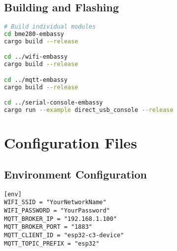 \documentclass[12pt,a4paper]{article}
\begin{document}
\subsection{Building and Flashing}
\begin{lstlisting}[language=bash, caption={Build and Flash Commands}]
# Build individual modules
cd bme280-embassy
cargo build --release

cd ../wifi-embassy  
cargo build --release

cd ../mqtt-embassy
cargo build --release

cd ../serial-console-embassy
cargo run --example direct_usb_console --release
\end{lstlisting}

\section{Configuration Files}

\subsection{Environment Configuration}
\begin{lstlisting}[caption={.cargo/config.toml}]
[env]
WIFI_SSID = "YourNetworkName"
WIFI_PASSWORD = "YourPassword"
MQTT_BROKER_IP = "192.168.1.100"
MQTT_BROKER_PORT = "1883"
MQTT_CLIENT_ID = "esp32-c3-device"
MQTT_TOPIC_PREFIX = "esp32"
\end{lstlisting}
\end{document}
